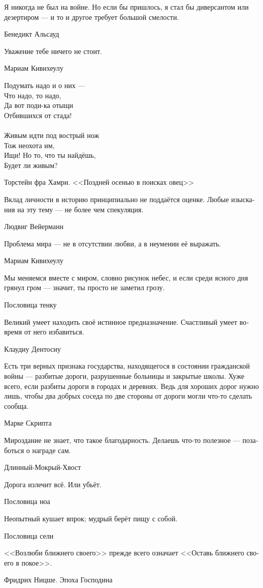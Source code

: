 \documentclass[a4paper,12pt,fleqn]{book}\usepackage{polyglossia}\setdefaultlanguage[babelshorthands=true]{russian}\setotherlanguage{english}\defaultfontfeatures{Ligatures=TeX,Mapping=tex-text}\usepackage{xcolor}\newcommand{\ml}[3]{#2}
\begin{document}
{\epigraph
{Я никогда не был на войне.
Но если бы пришлось, я стал бы диверсантом или дезертиром --- и то и другое требует большой смелости.}
{Бенедикт Альсауд}

\epigraph{
\ml{$0$}
{Уважение тебе ничего не стоит.}
{Respect costs you nothing.}
}{Мариам Кивихеулу}

\epigraph
{Подумать надо и о них ---\\
Что надо, то надо,\\
Да вот поди-ка отыщи\\
Отбившихся от стада!\\
~\\
Живым идти под вострый нож\\
Тож неохота им,\\
Ищи! Но то, что ты найдёшь,\\
Будет ли живым?}
{Торстейн фра Хамри.
<<Поздней осенью в поисках овец>>}

\epigraph
{Вклад личности в историю принципиально не поддаётся оценке.
Любые изыскания на эту тему --- не более чем спекуляция.}
{Людвиг Вейерманн}

\epigraph
{Проблема мира --- не в отсутствии любви, а в неумении её выражать.}
{Мариам Кивихеулу}

\epigraph
{Мы меняемся вместе с миром, словно рисунок небес, и если среди ясного дня грянул гром --- значит, ты просто не заметил грозу.}
{Пословица тенку}

\epigraph
{Великий умеет находить своё истинное предназначение.
Счастливый умеет вовремя от него избавиться.}
{Клаудиу Дентосиу}

\epigraph
{Есть три верных признака государства, находящегося в состоянии гражданской войны --- разбитые дороги, разрушенные больницы и закрытые школы.
Хуже всего, если разбиты дороги в городах и деревнях.
Ведь для хороших дорог нужно лишь, чтобы два добрых соседа по две стороны от дороги могли что-то сделать сообща.}
{Марке Скрипта}

\epigraph
{Мироздание не знает, что такое благодарность.
Делаешь что-то полезное --- позаботься о награде сам.}
{Длинный-Мокрый-Хвост}

\epigraph{
\ml{$0$}
{Дорога излечит всё.}
{The road heal you.}
\ml{$0$}
{Или убьёт.}
{Or kill you.}
}{Пословица ноа}

\epigraph
{Неопытный кушает впрок;
мудрый берёт пищу с собой.}
{Пословица сели}

\epigraph
{<<Возлюби ближнего своего>> прежде всего означает <<Оставь ближнего своего в покое>>.}
{Фридрих Ницше.
Эпоха Господина}

}
\end{document}
